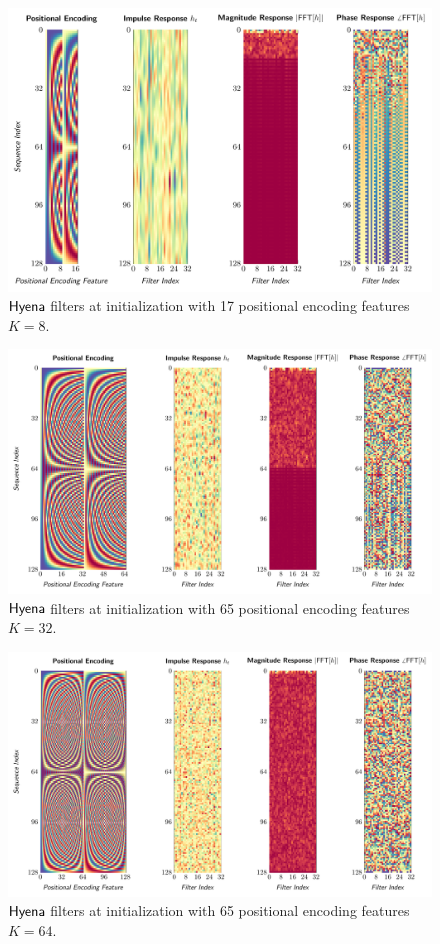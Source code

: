 %
\begin{figure}
    \centering
    \includegraphics[width=.8\linewidth]{figures/pos_enc_17_sin_freq_1.pdf}
    \caption{$\sf Hyena$ filters at initialization with 17 positional encoding features $K=8$.}
    \label{fig:pos_enc_17_1}
\end{figure}
\begin{figure}
    \centering
    \includegraphics[width=.8\linewidth]{figures/pos_enc_65_sin_freq_1.pdf}
    \caption{$\sf Hyena$ filters at initialization with 65 positional encoding features $K=32$.}
    \label{fig:pos_enc_65_1}
\end{figure}
\begin{figure}
    \centering
    \includegraphics[width=.9\linewidth]{figures/pos_enc_129_sin_freq_1.pdf}
    \caption{$\sf Hyena$ filters at initialization with 65 positional encoding features $K=64$.}
    \label{fig:pos_enc_128_1}
\end{figure}
